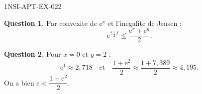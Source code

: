 \begin{corrige}{1NSI-APT-EX-022}

\textbf{Question 1.} Par convexite de $\mathrm{e}^x$ et l'inegalite de Jensen :
\[ \mathrm{e}^{\frac{x+y}{2}} \leq \frac{\mathrm{e}^x + \mathrm{e}^y}{2}. \]


\textbf{Question 2.} Pour $x=0$ et $y=2$ :
\[ \mathrm{e}^{1} \approx 2{,}718 \quad \text{et} \quad \frac{1 + \mathrm{e}^2}{2} \approx \frac{1 + 7{,}389}{2} \approx 4{,}195. \]
On a bien $\mathrm{e} < \dfrac{1 + \mathrm{e}^2}{2}$.

\end{corrige}

